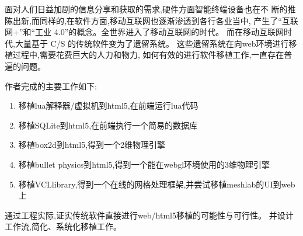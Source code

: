 
\begin{cabstract}
面对人们日益加剧的信息分享和获取的需求,硬件方面智能终端设备也在不
断的推陈出新,而同样的,在软件方面,移动互联网也逐渐渗透到各行各业当中,
产生了“互联网+”和“工业 4.0”的概念。全世界进入了移动互联网的时代。
而在移动互联网时代,大量基于 C/S 的传统软件变为了遗留系统。
这些遗留系统在向web环境进行移植过程中,需要花费巨大的人力和物力,
如何有效的进行软件移植工作,一直存在普遍的问题。

\par
作者完成的主要工作如下:

\begin{enumerate}
    \item 移植lua解释器/虚拟机到html5,在前端运行lua代码
    \item 移植SQLite到html5,在前端执行一个简易的数据库
    \item 移植box2d到html5,得到一个2维物理引擎
    \item 移植bullet physics到html5,得到一个能在webgl环境使用的3维物理引擎
    \item 移植VCLlibrary,得到一个在线的网格处理框架,并尝试移植meshlab的UI到web上
\end{enumerate}

\par
通过工程实际,证实传统软件直接进行web/html5移植的可能性与可行性。
并设计工作流,简化、系统化移植工作。

\end{cabstract}

